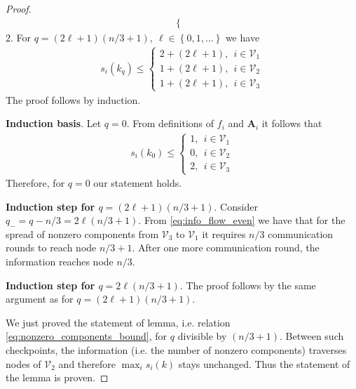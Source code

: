 \documentclass[10pt,a4paper]{amsart}
\newcommand{\braces}[1]{\left\{ #1 \right\}}
\newcommand{\cV}{\mathcal{V}}
\newcommand{\mA}{\mathbf{A}}
\begin{document}
\begin{proof}
\begin{align}
\begin{cases}
		\end{cases}
	\end{align}
	2. For $q = (2\ell + 1)(n/3 + 1),~ \ell\in\braces{0, 1, \ldots}$ we have
	\begin{align}\label{eq:info_flow_odd}
		s_i(k_q)\leq
		\begin{cases}
			2 + (2\ell + 1),~~ i\in\cV_1 \\
			1 + (2\ell + 1),~~ i\in\cV_2 \\
			1 + (2\ell + 1),~~ i\in\cV_3
		\end{cases}
	\end{align}
	The proof follows by induction.
	
	\noindent\textbf{Induction basis}. Let $q = 0$. From definitions of $f_i$ and $\mA_i$ it follows that
	\begin{align*}
			s_i(k_0) \leq 
			\begin{cases}
			1,~~ i\in\cV_1 \\
			0,~~ i\in\cV_2 \\
			2,~~ i\in\cV_3
		\end{cases}
	\end{align*}
	Therefore, for $q = 0$ our statement holds.
	
	\noindent\textbf{Induction step for $q = (2\ell + 1)(n/3 + 1)$}. Consider $q_- = q - n/3 = 2\ell(n/3 + 1)$. From \eqref{eq:info_flow_even} we have that for the spread of nonzero components from $\cV_3$ to $\cV_1$ it requires $n/3$ communication rounds to reach node $n/3 + 1$. After one more communication round, the information reaches node $n/3$.
	
	\noindent\textbf{Induction step for $q = 2\ell (n/3 + 1)$}. The proof follows by the same argument as for $q = (2\ell + 1)(n/3 + 1)$.

	\vspace{0.5cm} We just proved the statement of lemma, i.e. relation \eqref{eq:nonzero_components_bound}, for $q$ divisible by $(n/3 + 1)$. Between such checkpoints, the information (i.e. the number of nonzero components) traverses nodes of $\cV_2$ and therefore $\max_i s_i(k)$ stays unchanged. Thus the statement of the lemma is proven. 
\end{proof}
\end{document}
